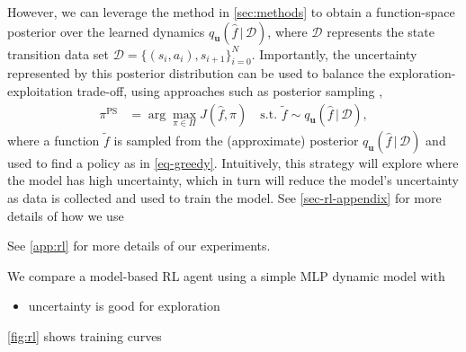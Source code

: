 \documentclass{article}
\newcommand{\dataset}{\ensuremath{\mathcal{D}}}
\newcommand{\transitionFn}{\ensuremath{f}}
\newcommand{\policy}{\ensuremath{\pi}}
\renewcommand{\mid}{\,|\,}
\begin{document}
However, we can leverage the method in \cref{sec:methods} to obtain a function-space posterior over the learned dynamics $q_{\mathbf{u}}(\hat{\transitionFn} \mid \dataset)$,
where $\mathcal{D}$ represents the state transition data set \(\mathcal{D} = \{(s_{i},a_{i}), s_{i+1}\}_{i=0}^{N}\).
Importantly, the uncertainty represented by this posterior distribution can be used to balance the exploration-exploitation trade-off,
using approaches such as posterior sampling \cite{osbandWhyPosteriorSampling2017,osbandMoreEfficientReinforcement2013},
\begin{align} \label{eq-posterior-sampling}
  \policy^{\text{PS}} &= \arg \max_{\pi \in \Pi} J(\hat{f}, \pi)
\quad \text{s.t. } \tilde{\transitionFn} \sim q_{\mathbf{u}}(\hat{\transitionFn} \mid \dataset),
\end{align}
where a function $\tilde{\transitionFn}$ is sampled from the (approximate) posterior $q_{\mathbf{u}}(\hat{\transitionFn} \mid \dataset)$ and used to find a policy as
in \cref{eq-greedy}.
Intuitively, this strategy will explore where the model has high uncertainty, which in turn will reduce the model's uncertainty as data is collected and used to
train the model.
See \cref{sec-rl-appendix} for more details of how we use



See \cref{app:rl} for more details of our experiments.

We compare a model-based RL agent using a simple MLP dynamic model with
\begin{itemize}
  \item uncertainty is good for exploration
\end{itemize}

\cref{fig:rl} shows training curves
\end{document}
